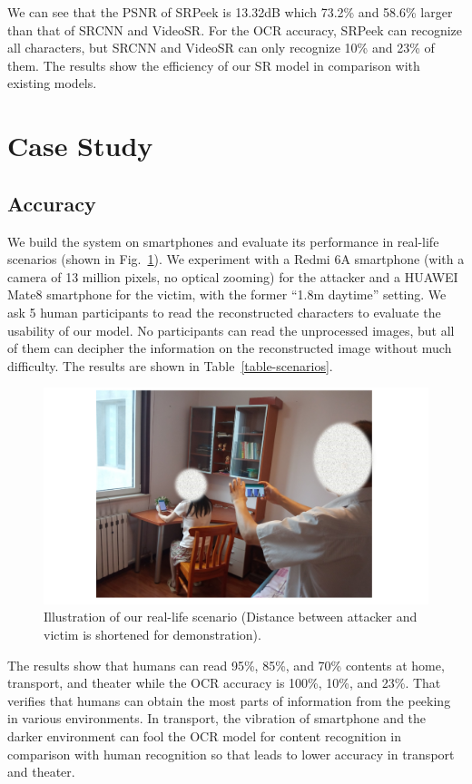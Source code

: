 We can see that the PSNR of SRPeek is 13.32dB which 73.2\% and 58.6\% larger than that of SRCNN and VideoSR. For the OCR accuracy, SRPeek can recognize all characters, but SRCNN and VideoSR can only recognize 10\% and 23\% of them. The results show the efficiency of our SR model in comparison with existing models.

\section{Case Study}
\label{case-study}
\subsection{Accuracy}

We build the system on smartphones and evaluate its performance in real-life scenarios (shown in Fig.~\ref{fig-reallife}). We experiment with a Redmi 6A smartphone (with a camera of 13 million pixels, no optical zooming) for the attacker and a HUAWEI Mate8 smartphone for the victim, with the former ``1.8m daytime'' setting. We ask 5 human participants to read the reconstructed characters to evaluate the usability of our model. No participants can read the unprocessed images, but all of them can decipher the information on the reconstructed image without much difficulty. The results are shown in Table~\ref{table-scenarios}.
\begin{figure}
	\centering
	\includegraphics[width=0.80\linewidth]{pic/reallife.pdf}
    \caption{Illustration of our real-life scenario (Distance between attacker and victim is shortened for demonstration).}
	\label{fig-reallife}
\end{figure}

The results show that humans can read 95\%, 85\%, and 70\% contents at home, transport, and theater while the OCR accuracy is 100\%, 10\%, and 23\%. That verifies that humans can obtain the most parts of information from the peeking in various environments. In transport, the vibration of smartphone and the darker environment can fool the OCR model for content recognition in comparison with human recognition so that leads to lower accuracy in transport and theater.


